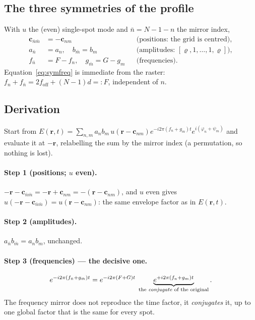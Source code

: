 \documentclass[11pt,a4paper]{article}
\begin{document}
\subsection{The three symmetries of the profile}
With $u$ the (even) single-spot mode and $\bar n=N-1-n$ the mirror index,
\begin{align}
\mathbf c_{\bar n\bar m}&=-\mathbf c_{nm} &&\text{(positions: the grid is centred)},\label{eq:symgeo}\\
a_{\bar n}&=a_n,\quad b_{\bar m}=b_m &&\text{(amplitudes: }[\varrho,1,\dots,1,\varrho]),\label{eq:symamp}\\
f_{\bar n}&=F-f_n,\quad g_{\bar m}=G-g_m &&\text{(frequencies)} .\label{eq:symfreq}
\end{align}
Equation~\eqref{eq:symfreq} is immediate from the raster:
$f_n+f_{\bar n}=2f_\mathrm{off}+(N-1)d=:F$, independent of $n$.

\subsection{Derivation}
Start from
$E(\mathbf r,t)=\sum_{n,m}a_nb_m\,u(\mathbf r-\mathbf c_{nm})
e^{-i2\pi(f_n+g_m)t}e^{i(\varphi_n+\psi_m)}$ and evaluate it at $-\mathbf r$,
relabelling the sum by the mirror index (a permutation, so nothing is lost).

\paragraph{Step 1 (positions; $u$ even).}
$-\mathbf r-\mathbf c_{\bar n\bar m}=-\mathbf r+\mathbf c_{nm}
=-(\mathbf r-\mathbf c_{nm})$, and $u$ even gives
$u(-\mathbf r-\mathbf c_{\bar n\bar m})=u(\mathbf r-\mathbf c_{nm})$: the same
envelope factor as in $E(\mathbf r,t)$.

\paragraph{Step 2 (amplitudes).} $a_{\bar n}b_{\bar m}=a_nb_m$, unchanged.

\paragraph{Step 3 (frequencies) --- the decisive one.}
\begin{equation}
e^{-i2\pi(f_{\bar n}+g_{\bar m})t}
=e^{-i2\pi(F+G)t}\;
\underbrace{e^{+i2\pi(f_n+g_m)t}}_{\text{the \emph{conjugate} of the original}} .
\end{equation}
The frequency mirror does not reproduce the time factor, it \emph{conjugates}
it, up to one global factor that is the same for every spot.
\end{document}
